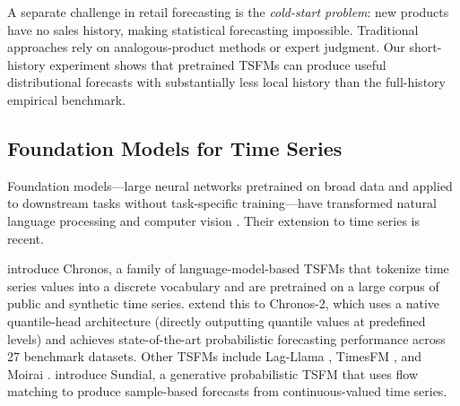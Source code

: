 \documentclass[msom,dblanonrev]{informs4}
\begin{document}
A separate challenge in retail forecasting is the \emph{cold-start problem}: new products have no sales history, making statistical forecasting impossible.
Traditional approaches rely on analogous-product methods \citep{Wright1997} or expert judgment.
Our short-history experiment shows that pretrained TSFMs can produce useful distributional forecasts with substantially less local history than the full-history empirical benchmark.

\subsection{Foundation Models for Time Series}

Foundation models---large neural networks pretrained on broad data and applied to downstream tasks without task-specific training---have transformed natural language processing \citep{Devlin2019BERT,Brown2020GPT3} and computer vision \citep{Dosovitskiy2021ViT}.
Their extension to time series is recent.

\citet{Ansari2024Chronos} introduce Chronos, a family of language-model-based TSFMs that tokenize time series values into a discrete vocabulary and are pretrained on a large corpus of public and synthetic time series.
\citet{Ansari2025Chronos2} extend this to Chronos-2, which uses a native quantile-head architecture (directly outputting quantile values at predefined levels) and achieves state-of-the-art probabilistic forecasting performance across 27 benchmark datasets.
Other TSFMs include Lag-Llama \citep{LagLlama2024}, TimesFM \citep{TimesFM2024}, and Moirai \citep{Moirai2024}.
\citet{LiuEtAl2025Sundial} introduce Sundial, a generative probabilistic TSFM that uses flow matching to produce sample-based forecasts from continuous-valued time series.
\end{document}
